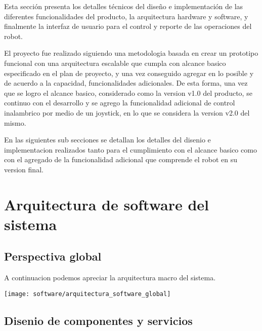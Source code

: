 
Esta sección presenta los detalles técnicos del diseño e implementación de las diferentes funcionalidades del producto, la arquitectura hardware y software, y finalmente la interfaz de usuario para el control y reporte de las operaciones del robot.

El proyecto fue realizado siguiendo una metodologia basada en crear un prototipo funcional con una arquitectura escalable que cumpla con alcance basico especificado en el plan de proyecto, y una vez conseguido agregar en lo posible y de acuerdo a la capacidad, funcionalidades adicionales.
De esta forma, una vez que se logro el alcance basico, considerado como la version v1.0 del producto, se continuo con el desarrollo y se agrego la funcionalidad adicional de control inalambrico por medio de un joystick, en lo que se considera la version v2.0 del mismo.

En las siguientes sub secciones se detallan los detalles del disenio e implementacion realizados tanto para el cumplimiento con el alcance basico como con el agregado de la funcionalidad adicional que comprende el robot en su version final.



\section{Arquitectura de software del sistema}


\subsection{Perspectiva global}

A continuacion podemos apreciar la arquitectura macro del sistema.

\begin{center}
  \texttt{[image: software/arquitectura\_software\_global]}
    \label{fig:arquitectura_software_global}

\end{center}



\subsection{Disenio de componentes y servicios}


